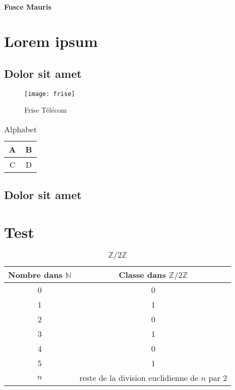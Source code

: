 \documentclass[12pt,a4paper]{article}
\begin{document}
\paragraph{Fusce Mauris}
\lipsum[1]

\section{Lorem ipsum}
\subsection{Dolor sit amet}

\begin{figure}[h]
	\centering
	\texttt{[image: frise]}
	\caption{Frise Télécom}
\end{figure}

\lipsum[1]

\begin{table}[h]
	\centering
	\begin{tabular}{|c|c|}
	\hline A & B \\
	\hline C & D \\
	\hline
	\end{tabular}
	\caption{Alphabet}
\end{table}

\subsection{Dolor sit amet}
\lipsum[1-3]

\appendix
{}
\section{Test}
\begin{table}[h]
	\centering
	\begin{tabular}{|c | c|}
		\hline \textbf{Nombre dans $\mathbb{N}$} & \textbf{Classe dans $\mathbb{Z}/2\mathbb{Z}$} \\
		\hline 0 & 0 \\
	        \hline 1 & 1 \\
		\hline 2 & 0 \\
		\hline 3 & 1 \\
		\hline 4 & 0 \\
		\hline 5 & 1 \\
		\hline $n$ & reste de la division euclidienne de $n$ par 2 \\
		\hline
	\end{tabular}
	\caption{$\mathbb{Z}/2\mathbb{Z}$}
\end{table}
\newpage
{}
\end{document}
